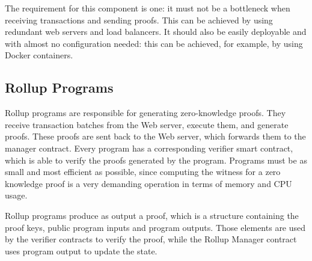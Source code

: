 The requirement for this component is one: it must not be a bottleneck when receiving transactions and sending proofs. This can be achieved by using redundant web servers and load balancers. It should also be easily deployable and with almost no configuration needed: this can be achieved, for example, by using Docker containers.

\subsection{Rollup Programs\label{sec:designrollupprograms}}
Rollup programs are responsible for generating zero-knowledge proofs. They receive transaction batches from the Web server, execute them, and generate proofs. These proofs are sent back to the Web server, which forwards them to the manager contract. Every program has a corresponding verifier smart contract, which is able to verify the proofs generated by the program. Programs must be as small and most efficient as possible, since computing the witness for a zero knowledge proof is a very demanding operation in terms of memory and CPU usage.

Rollup programs produce as output a proof, which is a structure containing the proof keys, public program inputs and program outputs. Those elements are used by the verifier contracts to verify the proof, while the Rollup Manager contract uses program output to update the state.
